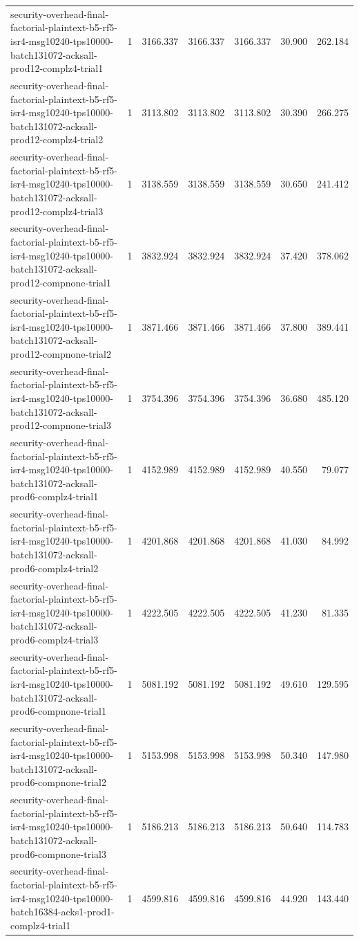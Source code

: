 \begin{tabular}{lrrrrrr}
security-overhead-final-factorial-plaintext-b5-rf5-isr4-msg10240-tps10000-batch131072-acksall-prod12-complz4-trial1 & 1 & 3166.337 & 3166.337 & 3166.337 & 30.900 & 262.184 \\
security-overhead-final-factorial-plaintext-b5-rf5-isr4-msg10240-tps10000-batch131072-acksall-prod12-complz4-trial2 & 1 & 3113.802 & 3113.802 & 3113.802 & 30.390 & 266.275 \\
security-overhead-final-factorial-plaintext-b5-rf5-isr4-msg10240-tps10000-batch131072-acksall-prod12-complz4-trial3 & 1 & 3138.559 & 3138.559 & 3138.559 & 30.650 & 241.412 \\
security-overhead-final-factorial-plaintext-b5-rf5-isr4-msg10240-tps10000-batch131072-acksall-prod12-compnone-trial1 & 1 & 3832.924 & 3832.924 & 3832.924 & 37.420 & 378.062 \\
security-overhead-final-factorial-plaintext-b5-rf5-isr4-msg10240-tps10000-batch131072-acksall-prod12-compnone-trial2 & 1 & 3871.466 & 3871.466 & 3871.466 & 37.800 & 389.441 \\
security-overhead-final-factorial-plaintext-b5-rf5-isr4-msg10240-tps10000-batch131072-acksall-prod12-compnone-trial3 & 1 & 3754.396 & 3754.396 & 3754.396 & 36.680 & 485.120 \\
security-overhead-final-factorial-plaintext-b5-rf5-isr4-msg10240-tps10000-batch131072-acksall-prod6-complz4-trial1 & 1 & 4152.989 & 4152.989 & 4152.989 & 40.550 & 79.077 \\
security-overhead-final-factorial-plaintext-b5-rf5-isr4-msg10240-tps10000-batch131072-acksall-prod6-complz4-trial2 & 1 & 4201.868 & 4201.868 & 4201.868 & 41.030 & 84.992 \\
security-overhead-final-factorial-plaintext-b5-rf5-isr4-msg10240-tps10000-batch131072-acksall-prod6-complz4-trial3 & 1 & 4222.505 & 4222.505 & 4222.505 & 41.230 & 81.335 \\
security-overhead-final-factorial-plaintext-b5-rf5-isr4-msg10240-tps10000-batch131072-acksall-prod6-compnone-trial1 & 1 & 5081.192 & 5081.192 & 5081.192 & 49.610 & 129.595 \\
security-overhead-final-factorial-plaintext-b5-rf5-isr4-msg10240-tps10000-batch131072-acksall-prod6-compnone-trial2 & 1 & 5153.998 & 5153.998 & 5153.998 & 50.340 & 147.980 \\
security-overhead-final-factorial-plaintext-b5-rf5-isr4-msg10240-tps10000-batch131072-acksall-prod6-compnone-trial3 & 1 & 5186.213 & 5186.213 & 5186.213 & 50.640 & 114.783 \\
security-overhead-final-factorial-plaintext-b5-rf5-isr4-msg10240-tps10000-batch16384-acks1-prod1-complz4-trial1 & 1 & 4599.816 & 4599.816 & 4599.816 & 44.920 & 143.440 \\

\end{tabular}
